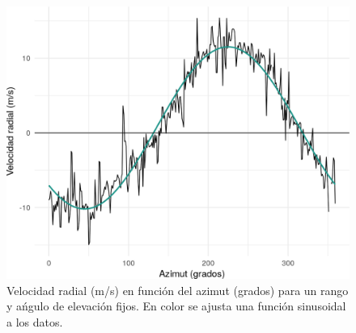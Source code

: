 \documentclass[12pt,spanish,oneside, a4paper]{book}
\begin{document}
\begin{figure}

{\centering \includegraphics{Defensa/Fig/vad-1} 

}

\caption{Velocidad radial (m/s) en función del azimut (grados) para un rango y ańgulo de elevación fijos. En color se  ajusta una función sinusoidal a los datos. \label{vad}}\label{fig:vad}
\end{figure}
\end{document}
